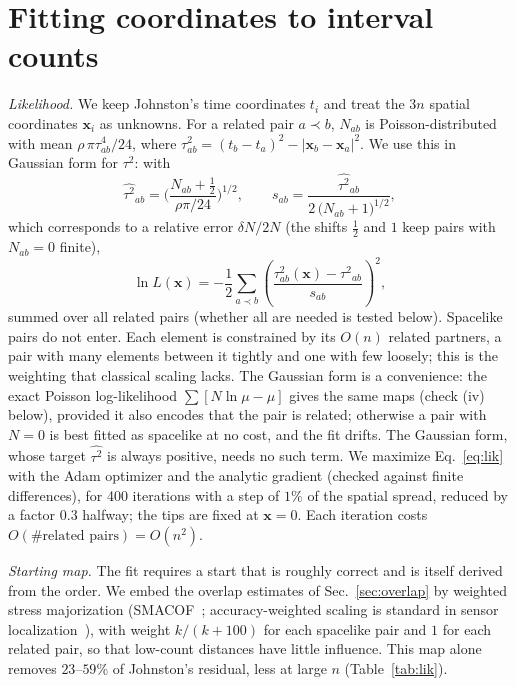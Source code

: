 \documentclass[prd,twocolumn,superscriptaddress,nofootinbib,amsmath,amssymb,floatfix]{revtex4-2}
\begin{document}
\section{Fitting coordinates to interval counts}\label{sec:likelihood}
\emph{Likelihood.} We keep Johnston's time coordinates $t_i$ and treat the $3n$ spatial coordinates $\mathbf x_i$ as unknowns. For a related pair $a\prec b$, $N_{ab}$ is Poisson-distributed with mean $\rho\,\pi\tau_{ab}^4/24$, where $\tau_{ab}^2=(t_b-t_a)^2-|\mathbf x_b-\mathbf x_a|^2$. We use this in Gaussian form for $\tau^2$: with
\begin{equation}
\widehat{\tau^2}_{ab}=\Big(\frac{N_{ab}+\tfrac12}{\rho\pi/24}\Big)^{1/2},\qquad s_{ab}=\frac{\widehat{\tau^2}_{ab}}{2\,\big(N_{ab}+1\big)^{1/2}},
\end{equation}
which corresponds to a relative error $\delta N/2N$ (the shifts $\tfrac12$ and $1$ keep pairs with $N_{ab}=0$ finite),
\begin{equation}
\ln L(\mathbf x)=-\frac{1}{2}\sum_{a\prec b}\left(\frac{\tau^2_{ab}(\mathbf x)-\widehat{\tau^2}_{ab}}{s_{ab}}\right)^{2},
\label{eq:lik}
\end{equation}
summed over all related pairs (whether all are needed is tested below). Spacelike pairs do not enter. Each element is constrained by its $O(n)$ related partners, a pair with many elements between it tightly and one with few loosely; this is the weighting that classical scaling lacks. The Gaussian form is a convenience: the exact Poisson log-likelihood $\sum[N\ln\mu-\mu]$ gives the same maps (check (iv) below), provided it also encodes that the pair is related; otherwise a pair with $N=0$ is best fitted as spacelike at no cost, and the fit drifts. The Gaussian form, whose target $\widehat{\tau^2}$ is always positive, needs no such term. We maximize Eq.~\eqref{eq:lik} with the Adam optimizer and the analytic gradient (checked against finite differences), for 400 iterations with a step of $1\%$ of the spatial spread, reduced by a factor $0.3$ halfway; the tips are fixed at $\mathbf x=0$. Each iteration costs $O(\#\text{related pairs})=O(n^2)$.

\emph{Starting map.} The fit requires a start that is roughly correct and is itself derived from the order. We embed the overlap estimates of Sec.~\ref{sec:overlap} by weighted stress majorization (SMACOF~\cite{deLeeuwMair09}; accuracy-weighted scaling is standard in sensor localization~\cite{CostaPatwariHero06}), with weight $k/(k+100)$ for each spacelike pair and $1$ for each related pair, so that low-count distances have little influence. This map alone removes $23$--$59\%$ of Johnston's residual, less at large $n$ (Table~\ref{tab:lik}).
\end{document}
